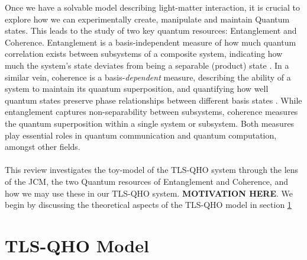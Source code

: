 \documentclass[12pt,a4paper]{article}
\begin{document}
Once we have a solvable model describing light-matter interaction, it is crucial to explore how we can experimentally create, manipulate and maintain Quantum states. This leads to the study of two key quantum resources: Entanglement and Coherence. Entanglement is a basis-independent measure of how much quantum correlation exists between subsystems of a composite system, indicating how much the system's state deviates from being a separable (product) state \cite{Entanglement2009-Definition}. In a similar vein, coherence is a basis-\textit{dependent} measure, describing the ability of a system to maintain its quantum superposition, and quantifying how well quantum states preserve phase relationships between different basis states \cite{Coherence2017-Colloquium}. While entanglement captures non-separability between subsystems, coherence measures the quantum superposition within a single system or subsystem. Both measures play essential roles in quantum communication and quantum computation, amongst other fields.
\\
\\
This review investigates the toy-model of the TLS-QHO system through the lens of the JCM, the two Quantum resources of Entanglement and Coherence, and how we may use these in our TLS-QHO system. \textbf{MOTIVATION HERE}. We begin by discussing the theoretical aspects of the TLS-QHO model in section \ref{TLS-QHO} 

\section{TLS-QHO Model} \label{TLS-QHO}


\newpage

 
 
\end{document}
